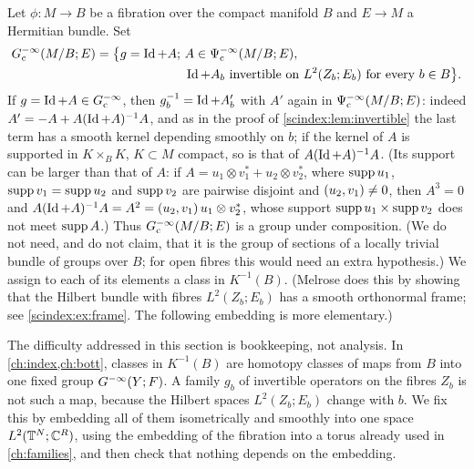 Let $\phi:M\to B$ be a fibration over the compact manifold $B$ and $E\to M$ a
Hermitian bundle. Set
\begin{equation*}
  \begin{aligned}
  \Ginf_{\mathrm c}(M/B;E)=\bigl\{g=\Id+A;\ &A\in\Psido{-\infty}_{\mathrm c}(M/B;E),\\
  &\Id+A_b\text{ invertible on }L^2(Z_b;E_b)\text{ for every }b\in B\bigr\}.
  \end{aligned}
\end{equation*}
If $g=\operatorname{Id}+A\in G^{-\infty}_{\mathrm c}$, then $g_b^{-1}=\operatorname{Id}+A'_b$ with $A'$ again in
$\Psi^{-\infty}_{\mathrm c}(M/B;E)$: indeed $A'=-A+A(\operatorname{Id}+A)^{-1}A$, and as in the
proof of \cref{scindex:lem:invertible} the last term has a smooth kernel
depending smoothly on $b$; if the kernel of $A$ is supported in $K\times_BK$,
$K\subset M$ compact, so is that of $A(\operatorname{Id}+A)^{-1}A$. (Its support can be larger
than that of $A$: if $A=u_1\otimes v_1^*+u_2\otimes v_2^*$, where $\operatorname{supp} u_1$,
$\operatorname{supp} v_1=\operatorname{supp} u_2$ and $\operatorname{supp} v_2$ are pairwise disjoint and
$( u_2, v_1)\ne0$, then $A^3=0$ and $A(\operatorname{Id}+A)^{-1}A=A^2=
( u_2, v_1)\,u_1\otimes v_2^*$, whose support $\operatorname{supp} u_1\times\operatorname{supp} v_2$
does not meet $\operatorname{supp} A$.) Thus $G^{-\infty}_{\mathrm c}(M/B;E)$ is a group under
composition. (We do not need, and do not claim, that it is the group of sections
of a locally trivial bundle of groups over $B$; for open fibres this would need
an extra hypothesis.) We assign to each of its elements a class
in $K^{-1}(B)$. (Melrose does this by showing that the Hilbert bundle with fibres
$L^2(Z_b;E_b)$ has a smooth orthonormal frame; see \cref{scindex:ex:frame}. The
following embedding is more elementary.)

\begin{discussion}
  The difficulty addressed in this section is bookkeeping, not analysis. In
  \cref{ch:index,ch:bott}, classes in $K^{-1}(B)$ are homotopy classes of maps
  from $B$ into one fixed group $G^{-\infty}(Y;F)$. A family $g_b$ of invertible
  operators on the fibres $Z_b$ is not such a map, because the Hilbert spaces
  $L^2(Z_b;E_b)$ change with $b$. We fix this by embedding all of them
  isometrically and smoothly into one space $L^2(\mathbb{T}^N;\mathbb{C}^R)$, using the
  embedding of the fibration into a torus already used in \cref{ch:families}, and
  then check that nothing depends on the embedding.
\end{discussion}

